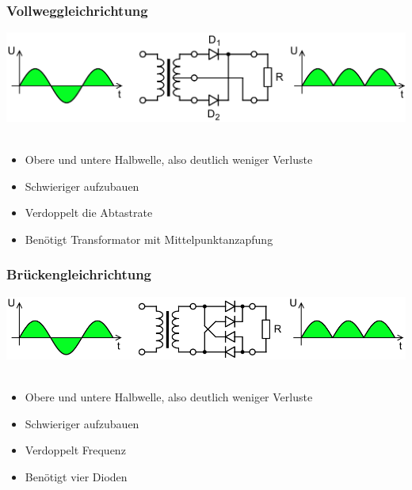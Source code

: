 \begin{frame}
  \frametitle{Vollweggleichrichtung}
  \begin{center}
    \includegraphics[width=1\textwidth,height=.6\textheight,keepaspectratio]{a05/Fullwave_rectifier.png}\\
    \tiny \hyperlink{refs}{\cite{wm}} \\[1em] \large
    \begin{itemize}
      \item Obere und untere Halbwelle, also deutlich weniger Verluste
      \item Schwieriger aufzubauen
      \item Verdoppelt die Abtastrate
      \item Benötigt Transformator mit Mittelpunktanzapfung
    \end{itemize}
  \end{center}
\end{frame}

\begin{frame}
  \frametitle{Brückengleichrichtung}
  \begin{center}
    \includegraphics[width=1\textwidth,height=.6\textheight,keepaspectratio]{a05/Gratz_rectifier.png}\\
    \tiny \hyperlink{refs}{\cite{wm}} \\[1em] \large
    \begin{itemize}
      \item Obere und untere Halbwelle, also deutlich weniger Verluste
      \item Schwieriger aufzubauen
      \item Verdoppelt Frequenz
      \item Benötigt vier Dioden
    \end{itemize}
  \end{center}
\end{frame}

